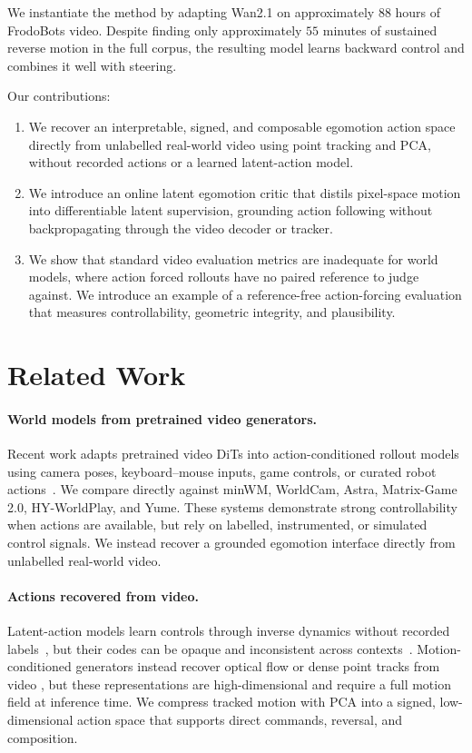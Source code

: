 \documentclass[letterpaper]{article} %
\begin{document}
We instantiate the method by adapting Wan2.1 on approximately $88$ hours of
FrodoBots video. Despite finding only approximately $55$ minutes of sustained
reverse motion in the full corpus, the resulting model learns backward
control and combines it well with steering.

Our contributions:
\begin{enumerate}

\item We recover an interpretable, signed, and composable egomotion action
    space directly from unlabelled real-world video using point tracking and
    PCA, without recorded actions or a learned latent-action model.

\item We introduce an online latent egomotion critic that distils
    pixel-space motion into differentiable latent supervision, grounding
    action following without backpropagating through the video decoder or
    tracker.

\item We show that standard video evaluation metrics are inadequate for
world models, where action forced rollouts have no paired reference to judge against. We introduce an example of a reference-free action-forcing evaluation that measures controllability, geometric integrity, and plausibility.

\end{enumerate}

\section{Related Work}

\paragraph{World models from pretrained video generators.}
Recent work adapts pretrained video DiTs into action-conditioned rollout
models using camera poses, keyboard--mouse inputs, game controls, or curated
robot actions~\cite{minwm,worldcam,astra,matrixgame2,hyworldplay,yume,
cosmos,dws,vid2world}. We compare directly against minWM, WorldCam, Astra,
Matrix-Game 2.0, HY-WorldPlay, and Yume. These systems demonstrate strong
controllability when actions are available, but rely on labelled,
instrumented, or simulated control signals. We instead recover a grounded
egomotion interface directly from unlabelled real-world video.

\paragraph{Actions recovered from video.}
Latent-action models learn controls through inverse dynamics without recorded
labels~\cite{genie,lapo,lapa,adaworld}, but their codes can be opaque and
inconsistent across contexts~\cite{olafworld}. Motion-conditioned generators
instead recover optical flow or dense point tracks from video
\cite{motionprompting,flovd,onlyflow}, but these representations are
high-dimensional and require a full motion field at inference time. We
compress tracked motion with PCA into a signed, low-dimensional action space
that supports direct commands, reversal, and composition.
\end{document}
